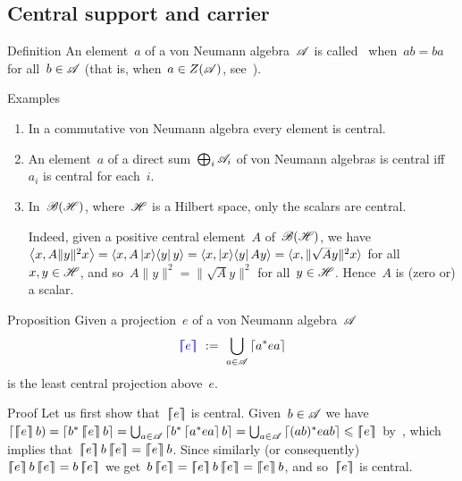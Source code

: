 \documentclass[a]{subfiles}
\begin{document}
\subsection{Central support and carrier}
\begin{parsec}%
\begin{point}{Definition}%
An element~$a$ of a von Neumann algebra~$\mathscr{A}$
is called~
when~$ab=ba$ for all~$b\in\mathscr{A}$
(that is, when~$a\in Z(\mathscr{A})$, see~).
\end{point}
\begin{point}{Examples}%
\begin{enumerate}
\item
In a commutative von Neumann algebra
every element is central.
\item
An element~$a$ of a direct sum~$\bigoplus_i \mathscr{A}_i$
of von Neumann algebras
is central iff~$a_i$ is central for each~$i$.
\item
In~$\mathscr{B}(\mathscr{H})$,
where~$\mathscr{H}$ is a Hilbert space,
only the scalars are central.

Indeed,
given a positive central element~$A$ 
of~$\mathscr{B}(\mathscr{H})$,
we have $\left<x, A\|y\|^2 x\right>
= \left<x,A \left|x\right>\!\left<y\right| y\right>
= \left<x,\left|x\right>\!\left<y\right|A y\right>
= \left<x,\smash{\|\sqrt{A}y\|^2 }x\right>$
for all~$x,y\in\mathscr{H}$,
and so~$A\|y\|^2= \|\sqrt{A}y\|^2$
for all~$y\in\mathscr{H}$.
Hence~$A$ is (zero or) a scalar.
\end{enumerate}
\end{point}
\begin{point}{Proposition}%
Given a projection~$e$ of a von Neumann algebra~$\mathscr{A}$
\begin{equation*}
	\Define{\cceil{e}}\ :=\ 
	\bigcup_{a\in\scrA} \ceil{a^* e a}
\end{equation*}
is the least central projection above~$e$.
\begin{point}{Proof}%
Let us first show that~$\left\lceil\!\!\left\lceil e\right\rceil\!\!\right\rceil$ is central.
Given~$b\in\mathscr{A}$
we have $\ceill{\cceil{e}b}=\ceil{b^*\cceil{e}b}
=\bigcup_{a\in\scrA} \ceil{b^*\ceil{a^*ea}b}
= \bigcup_{a\in \scrA} \ceil{(ab)^* eab}
\leq \cceil{e}$
by~,
which implies that~$\cceil{e}b\cceil{e}=\cceil{e}b$.
Since similarly (or consequently)
$\cceil{e}b\cceil{e} = b\cceil{e}$
we get~$b\cceil{e}=\cceil{e}b\cceil{e}
=\cceil{e}b$,
and so~$\left\lceil\!\!\left\lceil e\right\rceil\!\!\right\rceil$ is central.


\end{point}
\end{point}
\end{parsec}
\end{document}
